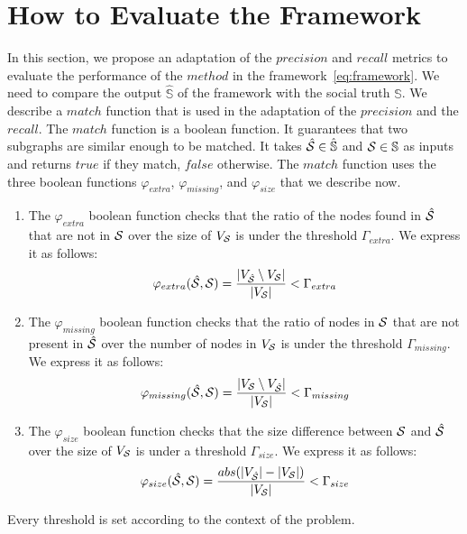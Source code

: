 \documentclass{llncs}
\begin{document}
\section{How to Evaluate the Framework}\label{sec:evaluation}
In this section, we propose an adaptation of the \(precision\) and \(recall\) metrics to evaluate the performance of the \(method\) in the framework~\eqref{eq:framework}.
We need to compare the output \(\hat{\mathbb{S}}\) of the framework with the social truth \(\mathbb{S}\).
We describe a \(match\) function that is used in the adaptation of the \(precision\) and the \(recall\).
The \(match\) function is a boolean function.
It guarantees that two subgraphs are similar enough to be matched.
It takes \(\hat{\cal{S}} \in \hat{\mathbb{S}}\) and \({\cal{S}} \in \mathbb{S}\) as inputs and returns \(true\) if they match, \(false\) otherwise.
The \(match\) function uses the three boolean functions \(\varphi_{extra}\), \(\varphi_{missing}\), and \(\varphi_{size}\) that we describe now.

\begin{enumerate}
\item The \(\varphi_{extra}\) boolean function checks that the ratio of the nodes found in \(\hat{\cal{S}}\) that are not in \({\cal{S}}\) over the size of \(V_{\cal S}\) is under the threshold \(\Gamma_{extra}\).
We express it as follows:
\begin{equation}
    \varphi_{extra}(\hat{\cal S}, {\cal S}) = \frac{|V_{\hat{\cal{S}}} \setminus V_{\cal S}|}{|V_{\cal S}|} < \Gamma_{extra}
\end{equation}
\item The \(\varphi_{missing}\) boolean function checks that the ratio of nodes in \({\cal{S}}\) that are not present in \(\hat{{\cal{S}}}\) over the number of nodes in \(V_{\cal{S}}\) is under the threshold \(\Gamma_{missing}\).
We express it as follows:
\begin{equation}
    \varphi_{missing}(\hat{\cal S}, {\cal S}) = \frac{|V_{\cal{S}} \setminus V_{\hat{\cal{S}}} |}{|V_{\cal{S}}|} < \Gamma_{missing}
\end{equation}
\item The \(\varphi_{size}\) boolean function checks that the size difference between \({\cal{S}}\) and \(\hat{\cal{S}}\) over the size of \(V_{\cal S}\) is under a threshold \(\Gamma_{size}\).
We express it as follows:
\begin{equation}
    \varphi_{size}(\hat{\cal S}, {\cal S}) = \frac{abs(|V_{\hat{\cal{S}}}| - |V_{\cal{S}}| )}{|V_{\cal{S}}|} < \Gamma_{size}
\end{equation}
\end{enumerate}
Every threshold is set according to the context of the problem.
\end{document}
